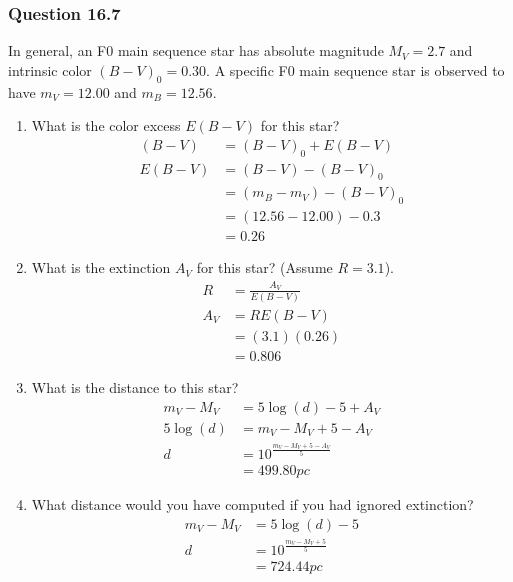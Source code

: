 \documentclass{math}
\begin{document}
\subsubsection*{Question 16.7}
In general, an F0 main sequence star has absolute magnitude \( M_V = 2.7 \) and
intrinsic color \( (B-V)_0 = 0.30 \). A specific F0 main sequence star is
observed to have \( m_V = 12.00 \) and \( m_B = 12.56 \).
\begin{enumerate}
  \item What is the color excess \( E(B-V) \) for this star?
  \begin{align*}
    (B-V) &= (B-V)_0+E(B-V) \\
    E(B-V) &= (B-V)-(B-V)_0 \\
    &= (m_B-m_V)-(B-V)_0 \\
    &= (12.56-12.00)-0.3 \\
    &= 0.26
  \end{align*}
  \item What is the extinction \( A_V \) for this star? (Assume \( R = 3.1 \)).
  \begin{align*}
    R &= \frac{A_V}{E(B-V)} \\
    A_V &= RE(B-V) \\
    &= (3.1)(0.26) \\
    &= 0.806
  \end{align*}
  \item What is the distance to this star?
  \begin{align*}
    m_V-M_V &= 5\log(d)-5+A_V \\
    5\log(d) &= m_V-M_V+5-A_V \\
    d &= 10^{\frac{m_V-M_V+5-A_V}{5}} \\
    &= 499.80pc
  \end{align*}
  \item What distance would you have computed if you had ignored extinction?
  \begin{align*}
    m_V-M_V &= 5\log(d)-5 \\
    d &= 10^{\frac{m_V-M_V+5}{5}} \\
    &= 724.44pc
  \end{align*}
\end{enumerate}
\end{document}
